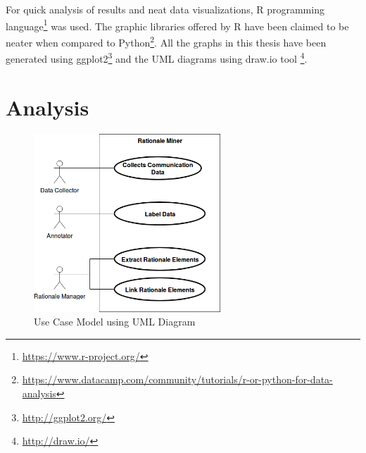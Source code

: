 \documentclass[a4paper,12pt,twoside]{report}
\begin{document}
\newline \newline
For quick analysis of results and neat data visualizations, R programming language\footnote{\url{https://www.r-project.org/}} was used. The graphic libraries offered by R have been claimed to be neater when compared to Python\footnote{\url{https://www.datacamp.com/community/tutorials/r-or-python-for-data-analysis}}. All the graphs in this thesis have been generated using ggplot2\footnote{\url{http://ggplot2.org/}} and the UML diagrams using draw.io tool \footnote{\url{http://draw.io/}}.

\chapter{Analysis}
\begin{figure}[h] %
    \centering
    \includegraphics[width=7cm]{thesis-use-case}
    \caption{Use Case Model using UML Diagram}
    \label{fig:usecaseModel}
\end{figure}
\end{document}
